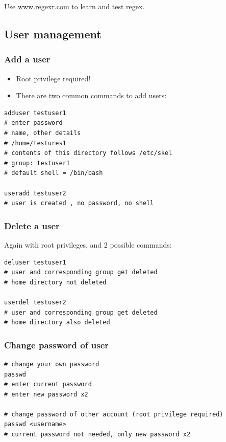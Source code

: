 \documentclass{article}
\begin{document}
Use \url{www.regexr.com} to learn and test regex.

\subsection{User management}

\subsubsection{Add a user}

\begin{itemize}
    \item Root privilege required!
    \item There are two common commands to add users:
\end{itemize}

\begin{verbatim}
adduser testuser1
# enter password
# name, other details
# /home/testures1
# contents of this directory follows /etc/skel
# group: testuser1
# default shell = /bin/bash

useradd testuser2
# user is created , no password, no shell
\end{verbatim}

\subsubsection{Delete a user}

Again with root privileges, and 2 possible commands:

\begin{verbatim}
deluser testuser1
# user and corresponding group get deleted
# home directory not deleted

userdel testuser2
# user and corresponding group get deleted
# home directory also deleted
\end{verbatim}

\subsubsection{Change password of user}

\begin{verbatim}
# change your own password
passwd
# enter current password
# enter new password x2

# change password of other account (root privilege required)
passwd <username>
# current password not needed, only new password x2
\end{verbatim}
\end{document}
